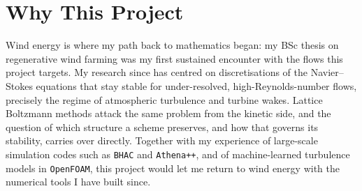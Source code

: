 \documentclass[a4paper,10pt]{article}
\begin{document}
\vspace{5pt}
\section*{Why This Project}
Wind energy is where my path back to mathematics began: my BSc thesis on regenerative wind farming
was my first sustained encounter with the flows this project targets. My research since has
centred on discretisations of the Navier--Stokes equations that stay stable for under-resolved,
high-Reynolds-number flows, precisely the regime of atmospheric turbulence and turbine wakes.
Lattice Boltzmann methods attack the same problem from the kinetic side, and the question of
which structure a scheme preserves, and how that governs its stability, carries over directly.
Together with my experience of large-scale simulation codes such as \texttt{BHAC} and
\texttt{Athena++}, and of machine-learned turbulence models in \texttt{OpenFOAM}, this project
would let me return to wind energy with the numerical tools I have built since.
\end{document}
